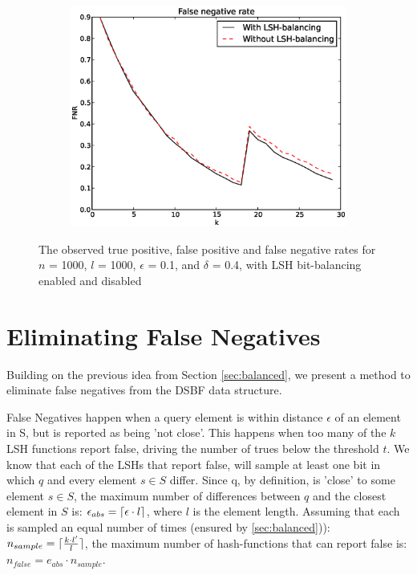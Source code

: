 \documentclass[a4paper,11pt]{article}
\DeclarePairedDelimiter{\ceil}{\lceil}{\rceil}
\begin{document}
\begin{figure}[H]
\begin{subfigure}{.5\textwidth}
  \includegraphics[width=.95\linewidth]{bitbalancing_FNR1}
\end{subfigure}
\caption{The observed true positive, false positive and false negative rates for $n$ = 1000, $l$ = 1000, $\epsilon$ = 0.1, and $\delta$ = 0.4, with LSH bit-balancing enabled and disabled}
\label{fig:bitbalance-fpnr}
\end{figure}


\section{Eliminating False Negatives}
Building on the previous idea from Section \ref{sec:balanced}, we present a method to eliminate false negatives from the DSBF data structure.

False Negatives \label{p:fn}happen when a query element is within distance $\epsilon$ of an element in S, but is reported as being 'not close'. This happens when too many of the $k$ LSH functions report false, driving the number of trues below the threshold $t$. We know that each of the LSHs that report false, will sample at least one bit in which $q$ and every element $s \in S$ differ. Since q, by definition, is 'close' to some element $s \in S$, the maximum number of differences between $q$ and the closest element in $S$ is: $\epsilon_{abs} = \ceil{\epsilon \cdot l}$, where $l$ is the element length. Assuming that each is sampled an equal number of times (ensured by \ref{sec:balanced})): $n_{sample} = \ceil{\frac{k \cdot l{'}}{l}}$, the maximum number of hash-functions that can report false is: $n_{false} = e_{abs} \cdot n_{sample}$.
\end{document}
